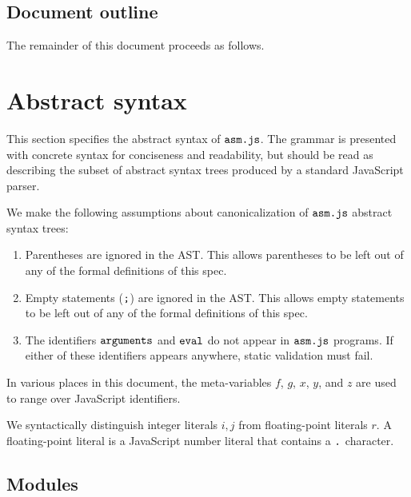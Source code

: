 \documentclass{article}
\newcommand{\mathjs}[1]{\mbox{\texttt{{#1}}}}
\begin{document}
\subsection{Document outline}

The remainder of this document proceeds as follows.

\section{Abstract syntax}

This section specifies the abstract syntax of $\mathjs{asm.js}$. The
grammar is presented with concrete syntax for conciseness and
readability, but should be read as describing the subset of abstract
syntax trees produced by a standard JavaScript parser.

We make the following assumptions about canonicalization of
$\mathjs{asm.js}$ abstract syntax trees:
\begin{enumerate}
\item Parentheses are ignored in the AST. This allows parentheses to
  be left out of any of the formal definitions of this spec.

\item Empty statements ($\mathjs{;}$) are ignored in the AST. This
  allows empty statements to be left out of any of the formal
  definitions of this spec.

\item The identifiers $\mathjs{arguments}$ and $\mathjs{eval}$ do not
  appear in $\mathjs{asm.js}$ programs. If either of these identifiers
  appears anywhere, static validation must fail.
\end{enumerate}

In various places in this document, the meta-variables $f$, $g$, $x$,
$y$, and $z$ are used to range over JavaScript identifiers.

We syntactically distinguish integer literals $i, j$ from
floating-point literals $r$. A floating-point literal is a JavaScript
number literal that contains a $\mathjs{.}$ character.

\subsection{Modules}
\end{document}
